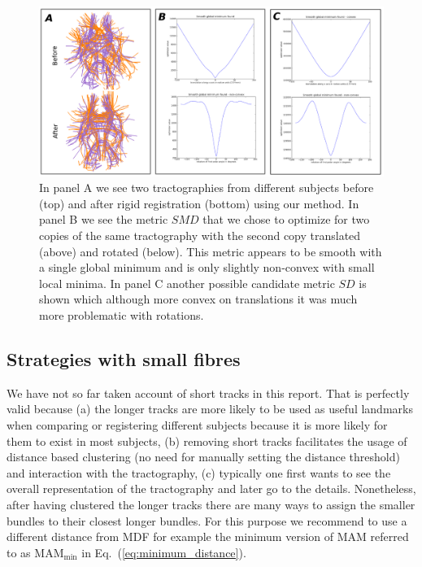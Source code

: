 \documentclass[preprint,authoryear,a4paper,10pt,onecolumn]{elsarticle}
\begin{document}
%
\begin{figure}
\begin{centering}
\includegraphics[scale=0.8]{last_figures/LSC_registration2}
\par\end{centering}
\caption{In panel A we see two tractographies from different subjects
  before (top) and after rigid registration (bottom) using our
  method. In panel B we see the metric $SMD$ that we chose to optimize
  for two copies of the same tractography with the second copy
  translated (above) and rotated (below). This metric appears to be
  smooth with a single global minimum and is only slightly non-convex
  with small local minima. In panel C another possible candidate metric
  $SD$ is shown which although more convex on translations it was much
  more problematic with rotations.\label{Flo:direct_registration}}
\end{figure}

\subsection{Strategies with small fibres}

We have not so far taken account of short tracks in this report. That
is perfectly valid because (a) the longer tracks are more likely to
be used as useful landmarks when comparing or registering different
subjects because it is more likely for them to exist in most subjects,
(b) removing short tracks facilitates the usage of distance based
clustering (no need for manually setting the distance threshold) and
interaction with the tractography, (c) typically one first wants to
see the overall representation of the tractography and later go to
the details. Nonetheless, after having clustered the longer tracks
there are many ways to assign the smaller bundles to their closest
longer bundles. For this purpose we recommend to use a different distance
from MDF for example the minimum version of MAM referred
to as $\textrm{MAM}_{\textrm{min}}$ in Eq.~(\ref{eq:minimum_distance}). 
\end{document}
